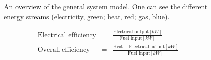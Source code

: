 \begin{figure}[H]
	\centering
	\setlength{\fboxsep}{0 cm}
	\setlength{\fboxsep}{0.1 cm}
	\caption{An overview of the general system model. One can see the different energy streams (electricity, green; heat, red; gas, blue).}
	\label{F:GeneralFlowshart}
\end{figure}

\begin{eqnarray}
\text{Electrical efficiency} &=& \frac{\text{Electrical output} [\unit{kW}]}{\text{Fuel input} [\unit{kW}]}\\
\text{Overall efficiency} &=& \frac{\text{Heat} + \text{Electrical output} [\unit{kW}]}{\text{Fuel input} [\unit{kW}]}
\end{eqnarray}